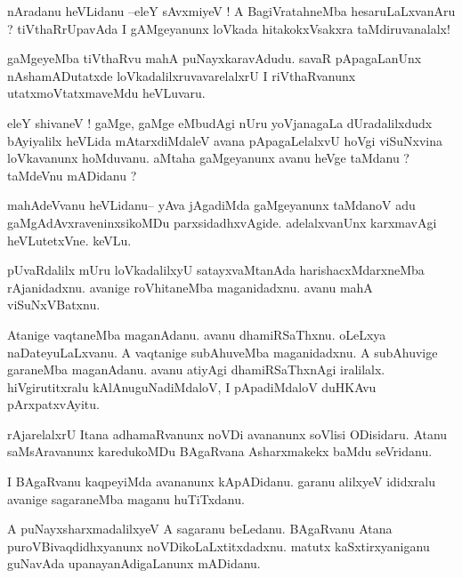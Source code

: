 \documentclass{article}
\begin{document}
\begin{mn}%
nAradanu heVLidanu --eleY sAvxmiyeV ! A BagiVratahneMba hesaruLaLxvanAru ? tiVthaRrUpavAda I 
gAMgeyanunx loVkada hitakokxVsakxra taMdiruvanalalx!
\end{mn}

\begin{mn}%
gaMgeyeMba tiVthaRvu mahA puNayxkaravAdudu. savaR pApagaLanUnx nAshamADutatxde 
loVkadalilxruvavarelalxrU I riVthaRvanunx utatxmoVtatxmaveMdu heVLuvaru.
\end{mn}

\begin{mn}%
eleY shivaneV ! gaMge, gaMge eMbudAgi nUru yoVjanagaLa dUradalilxdudx bAyiyalilx heVLida 
mAtarxdiMdaleV avana pApagaLelalxvU hoVgi viSuNxvina loVkavanunx hoMduvanu. aMtaha 
gaMgeyanunx avanu heVge taMdanu ? taMdeVnu mADidanu ?
\end{mn}

\begin{mn}%
mahAdeVvanu heVLidanu-- yAva jAgadiMda gaMgeyanunx taMdanoV adu gaMgAdAvxraveninxsikoMDu 
parxsidadhxvAgide. adelalxvanUnx karxmavAgi heVLutetxVne. keVLu.
\end{mn}

\begin{mn}%
pUvaRdalilx mUru loVkadalilxyU satayxvaMtanAda harishacxMdarxneMba rAjanidadxnu. avanige 
roVhitaneMba maganidadxnu. avanu mahA viSuNxVBatxnu.
\end{mn}

\begin{mn}%
Atanige vaqtaneMba maganAdanu. avanu dhamiRSaThxnu. oLeLxya naDateyuLaLxvanu. A vaqtanige 
subAhuveMba maganidadxnu. A subAhuvige garaneMba maganAdanu. avanu atiyAgi dhamiRSaThxnAgi 
iralilalx. hiVgirutitxralu kAlAnuguNadiMdaloV, I pApadiMdaloV duHKAvu pArxpatxvAyitu.
\end{mn}

\begin{mn}%
rAjarelalxrU Itana adhamaRvanunx noVDi avananunx soVlisi ODisidaru. Atanu saMsAravanunx 
karedukoMDu BAgaRvana Asharxmakekx baMdu seVridanu.
\end{mn}

\begin{mn}%
I BAgaRvanu kaqpeyiMda avananunx kApADidanu. garanu alilxyeV ididxralu avanige sagaraneMba 
maganu huTiTxdanu.
\end{mn}

\begin{mn}%
A puNayxsharxmadalilxyeV A sagaranu beLedanu. BAgaRvanu Atana puroVBivaqdidhxyanunx 
noVDikoLaLxtitxdadxnu. matutx kaSxtirxyaniganu guNavAda upanayanAdigaLanunx mADidanu.
\end{mn}
\end{document}

